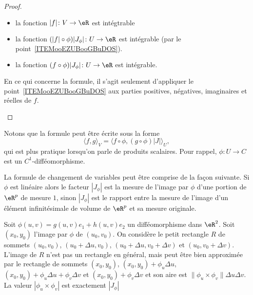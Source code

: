 \begin{proof}
\begin{enumerate}
\begin{itemize}
			      \item la fonction \( | f |\colon V\to \eR\) est intégtrable
			      \item la fonction \( (| f |\circ\phi)| J_{\phi} |\colon U\to \eR\) est intégrable (par le point~\ref{ITEMooEZUBooGBuDOS}).
			      \item la fonction \( (f\circ\phi)| J_{\phi} |\colon U\to \eR\) est intégrable.
		      \end{itemize}
		      En ce qui concerne la formule, il s'agit seulement d'appliquer le point~\ref{ITEMooEZUBooGBuDOS} aux parties positives, négatives, imaginaires et réelles de \( f\).
	\end{enumerate}
\end{proof}

Notons que la formule peut être écrite sous la forme
\begin{equation}        \label{EQooQKARooELPCFO}
	\langle f, g\rangle_V=\langle f\circ\phi, (g\circ\phi)| J |\rangle_U,
\end{equation}
qui est plus pratique lorsqu'on parle de produits scalaires. Pour rappel, \( \phi\colon U\to C\) est un \( C^1\)-difféomorphisme.

\begin{normaltext}
	La formule de changement de variables peut être comprise de la façon suivante. Si \( \phi\) est linéaire  alors le facteur \( |J_{\phi}|\) est la mesure de l'image par \( \phi\) d'une portion de \( \eR^p\) de mesure \( 1\), sinon  \( |J_{\phi}|\) est le rapport entre la mesure de l'image d'un élément infinitésimale de volume de \( \eR^p\) et sa mesure originale.

	Soit \( \phi(u,v)=g(u,v)e_1+h(u,v)e_2\) un difféomorphisme dans \( \eR^2\). Soit \( (x_0, y_0)\) l'image par \( \phi\) de \( (u_0,v_0)\). On considère le petit rectangle \( R\) de sommets \( (u_0,v_0)\), \( (u_0+\Delta u,v_0)\), \( (u_0+\Delta u,v_0+\Delta v)\) et \( (u_0,v_0+\Delta v)\). L'image de \( R\) n'est pas un rectangle en général, mais peut être bien approximée par le rectangle de sommets \( (x_0,y_0)\), \( (x_0 ,y_0)+ \phi_{u}\Delta u\), \( (x_0 ,y_0)+\phi_{u}\Delta u +\phi_{v}\Delta v\) et  \( (x_0 ,y_0)+ \phi_{v}\Delta v\) et son aire est \( \| \phi_{u}\times \phi_{v}\| \Delta u\Delta v\). La valeur \( |\phi_{u}\times \phi_{v}|\) est exactement \( |J_{\phi}|\)
\end{normaltext}

